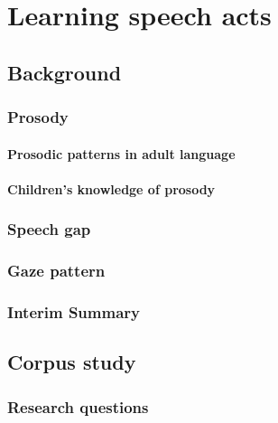 \chapter{Learning speech acts}
\label{chap:eng-sp}
\section{Background}
\label{sec:engsp:background}

\subsection{Prosody}
\label{sec:engsp:bg:prosody}
\subsubsection{Prosodic patterns in adult language}
\subsubsection{Children's knowledge of prosody}

\subsection{Speech gap}
\label{sec:engsp:bg:pause}

\subsection{Gaze pattern}
\label{sec:engsp:bg:gaze}


\subsection{Interim Summary}
\label{sec:engsp:bg:summary}

\section{Corpus study}
\label{sec:engsp:corpus}
\subsection{Research questions}
\label{sec:engsp:corpus:goal}

